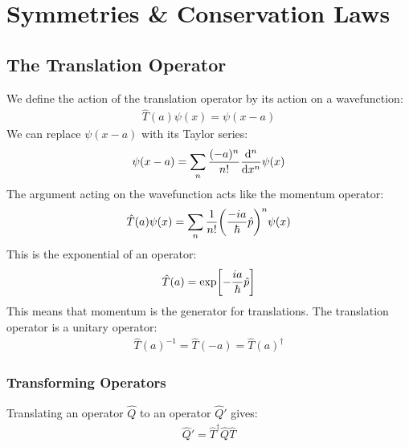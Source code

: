 \section{Symmetries \& Conservation Laws}
\subsection{The Translation Operator}
We define the action of the translation operator by its action on a wavefunction:
\begin{align*}
  \hat{T}(a)\psi(x)=\psi(x-a)
\end{align*}
We can replace $\psi(x-a)$ with its Taylor series:
\begin{align*}
  \psi(x-a)=\sum_n\dfrac{(-a)^n}{n!}\dv[n]{x}\psi(x)
\end{align*}
The argument acting on the wavefunction acts like the momentum operator:
\begin{align*}
  \hat{T}(a)\psi(x)=\sum_n\dfrac{1}{n!}\qty(\dfrac{-ia}{\hbar}\hat{p})^n\psi(x)
\end{align*}
This is the exponential of an operator:
\begin{align*}
  \hat{T}(a)=\mathrm{exp}\qty[-\dfrac{ia}{\hbar}\hat{p}]
\end{align*}
This means that momentum is the generator for translations. The translation operator is a unitary operator:
\begin{align*}
  \hat{T}(a)^{-1}=\hat{T}(-a)=\hat{T}(a)^\dag
\end{align*}
\subsubsection{Transforming Operators}
Translating an operator $\hat{Q}$ to an operator $\hat{Q}'$ gives:
\begin{align*}
  \hat{Q}'=\hat{T}^\dag\hat{Q}\hat{T}
\end{align*}
